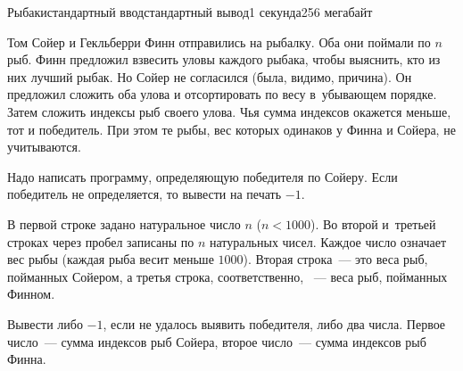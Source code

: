 \begin{problem}[(Антонов Ю.\,С.)]{Рыбаки}{стандартный ввод}{стандартный вывод}{1 секунда}{256 мегабайт}

Том Сойер и Гекльберри Финн отправились на рыбалку. Оба они поймали по $n$ рыб. Финн предложил взвесить уловы каждого рыбака, чтобы выяснить, кто из них лучший рыбак. Но Сойер не согласился (была, видимо, причина). Он предложил сложить оба улова и отсортировать по весу в~убывающем порядке. Затем сложить индексы рыб своего улова. Чья сумма индексов окажется меньше, тот и победитель. При этом те рыбы, вес которых одинаков у Финна и Сойера, не учитываются. 

Надо написать программу, определяющую победителя по Сойеру. Если победитель не определяется, то вывести на печать $-1$.




\InputFile
В первой строке задано натуральное число $n$ ($n<1000$). Во второй и~третьей строках через пробел записаны по  $n$ натуральных чисел. Каждое число означает вес рыбы (каждая рыба весит  меньше $1000$). Вторая строка~--- это веса рыб, пойманных Сойером, а третья строка, соответственно, ~--- веса рыб, пойманных Финном.


\OutputFile
Вывести либо $-1$, если не удалось выявить победителя, либо два числа. Первое число~--- сумма индексов рыб Сойера, второе число~--- сумма индексов рыб Финна.


\Examples

\begin{example}
%
%
\end{example}

\end{problem}

